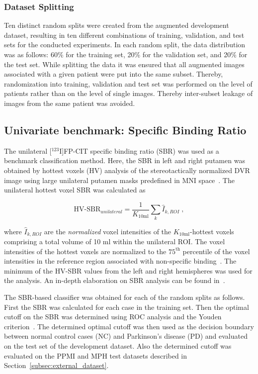 \subsubsection{Dataset Splitting}
\label{subsec:split}

Ten distinct random splits were created from the augmented development dataset, 
resulting in ten different combinations of training, validation, and test sets for the conducted experiments.
In each random split, the data distribution was as follows: 
60\% for the training set, 20\% for the validation set, and 20\% for the test set.
While splitting the data it was ensured that all augmented images associated with a given patient were put 
into the same subset.
Thereby, randomization into training, validation and test set was performed 
on the level of patients rather than on the level of single images.
Thereby inter-subset leakage of images from the same patient was avoided.

\subsection{Univariate benchmark: Specific Binding Ratio}
\label{subsec:sbr}

The unilateral [$^{123}$I]FP-CIT specific binding ratio (SBR) was used as a benchmark classification method.
Here, the SBR in left and right putamen was obtained by hottest voxels (HV) analysis of the stereotactically normalized 
DVR image using large unilateral putamen masks predefined in MNI space~\citep{Wenzel2019}.
The unilateral hottest voxel SBR was calculated as

\begin{equation}\label{eq:sbr}
  \text{HV-SBR}_{unilateral} = \frac{1}{K_{\text{10ml}}} \sum_{k} \hat{I}_{k, ROI} \;,
\end{equation}

where $\hat{I}_{k, ROI}$ are the \textit{normalized} voxel intensities of the $K_{\text{10ml}}$-hottest voxels 
comprising a total volume of 10 ml within the unilateral ROI.
The voxel intensities of the hottest voxels are normalized to the $75^{\text{th}}$ percentile of the voxel intensities 
in the reference region associated with non-specific binding~\citep{Wenzel2019}.
The minimum of the HV-SBR values from the left and right hemispheres was used for the analysis.
An in-depth elaboration on SBR analysis can be found in~\cite{Wenzel2019}.

The SBR-based classifier was obtained for each of the random splits as follows.
First the SBR was calculated for each case in the training set.
Then the optimal cutoff on the SBR was determined using ROC analysis and the Youden criterion~\citep{Youden1950}.
The determined optimal cutoff was then used as the decision boundary between normal control cases (NC) and Parkinson's disease (PD) 
and evaluated on the test set of the development dataset.
Also the determined cutoff was evaluated on the PPMI and MPH test datasets described in Section~\ref{subsec:external_dataset}.

